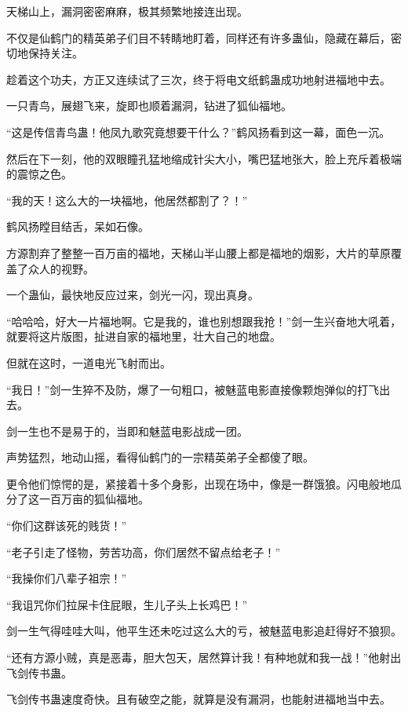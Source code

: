 
\begin{this_body}

天梯山上，漏洞密密麻麻，极其频繁地接连出现。

不仅是仙鹤门的精英弟子们目不转睛地盯着，同样还有许多蛊仙，隐藏在幕后，密切地保持关注。

趁着这个功夫，方正又连续试了三次，终于将电文纸鹤蛊成功地射进福地中去。

一只青鸟，展翅飞来，旋即也顺着漏洞，钻进了狐仙福地。

“这是传信青鸟蛊！他凤九歌究竟想要干什么？”鹤风扬看到这一幕，面色一沉。

然后在下一刻，他的双眼瞳孔猛地缩成针尖大小，嘴巴猛地张大，脸上充斥着极端的震惊之色。

“我的天！这么大的一块福地，他居然都割了？！”

鹤风扬瞠目结舌，呆如石像。

方源割弃了整整一百万亩的福地，天梯山半山腰上都是福地的烟影，大片的草原覆盖了众人的视野。

一个蛊仙，最快地反应过来，剑光一闪，现出真身。

“哈哈哈，好大一片福地啊。它是我的，谁也别想跟我抢！”剑一生兴奋地大吼着，就要将这片版图，扯进自家的福地里，壮大自己的地盘。

但就在这时，一道电光飞射而出。

“我日！”剑一生猝不及防，爆了一句粗口，被魅蓝电影直接像颗炮弹似的打飞出去。

剑一生也不是易于的，当即和魅蓝电影战成一团。

声势猛烈，地动山摇，看得仙鹤门的一宗精英弟子全都傻了眼。

更令他们惊愕的是，紧接着十多个身影，出现在场中，像是一群饿狼。闪电般地瓜分了这一百万亩的狐仙福地。

“你们这群该死的贱货！”

“老子引走了怪物，劳苦功高，你们居然不留点给老子！”

“我操你们八辈子祖宗！”

“我诅咒你们拉屎卡住屁眼，生儿子头上长鸡巴！”

剑一生气得哇哇大叫，他平生还未吃过这么大的亏，被魅蓝电影追赶得好不狼狈。

“还有方源小贼，真是恶毒，胆大包天，居然算计我！有种地就和我一战！”他射出飞剑传书蛊。

飞剑传书蛊速度奇快。且有破空之能，就算是没有漏洞，也能射进福地当中去。


\end{this_body}
